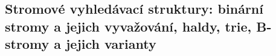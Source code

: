 \subsection{Stromové vyhledávací struktury: binární stromy a jejich vyvažování, haldy, trie, B-stromy a jejich varianty}